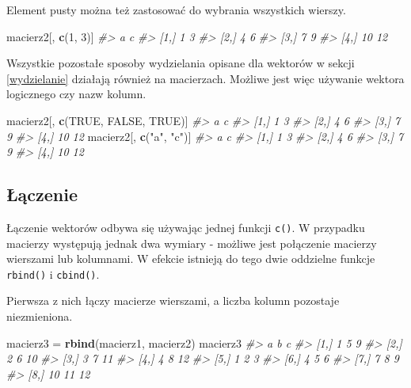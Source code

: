 \documentclass[paper=6in:9in,pagesize=pdftex,headinclude=on,footinclude=on,10pt]{scrbook}
\newenvironment{Shaded}{\begin{snugshade}}{\end{snugshade}}
\newcommand{\CommentTok}[1]{\textcolor[rgb]{0.56,0.35,0.01}{\textit{#1}}}
\newcommand{\DecValTok}[1]{\textcolor[rgb]{0.00,0.00,0.81}{#1}}
\newcommand{\KeywordTok}[1]{\textcolor[rgb]{0.13,0.29,0.53}{\textbf{#1}}}
\newcommand{\NormalTok}[1]{#1}
\newcommand{\OtherTok}[1]{\textcolor[rgb]{0.56,0.35,0.01}{#1}}
\newcommand{\StringTok}[1]{\textcolor[rgb]{0.31,0.60,0.02}{#1}}
\begin{document}
Element pusty można też zastosować do wybrania wszystkich wierszy.

\begin{Shaded}
\begin{Highlighting}[]
\NormalTok{macierz2[, }\KeywordTok{c}\NormalTok{(}\DecValTok{1}\NormalTok{, }\DecValTok{3}\NormalTok{)]}
\CommentTok{#>       a  c}
\CommentTok{#> [1,]  1  3}
\CommentTok{#> [2,]  4  6}
\CommentTok{#> [3,]  7  9}
\CommentTok{#> [4,] 10 12}
\end{Highlighting}
\end{Shaded}

Wszystkie pozostałe sposoby wydzielania opisane dla wektorów w sekcji \ref{wydzielanie} działają również na macierzach.
Możliwe jest więc używanie wektora logicznego czy nazw kolumn.

\begin{Shaded}
\begin{Highlighting}[]
\NormalTok{macierz2[, }\KeywordTok{c}\NormalTok{(}\OtherTok{TRUE}\NormalTok{, }\OtherTok{FALSE}\NormalTok{, }\OtherTok{TRUE}\NormalTok{)]}
\CommentTok{#>       a  c}
\CommentTok{#> [1,]  1  3}
\CommentTok{#> [2,]  4  6}
\CommentTok{#> [3,]  7  9}
\CommentTok{#> [4,] 10 12}
\NormalTok{macierz2[, }\KeywordTok{c}\NormalTok{(}\StringTok{"a"}\NormalTok{, }\StringTok{"c"}\NormalTok{)]}
\CommentTok{#>       a  c}
\CommentTok{#> [1,]  1  3}
\CommentTok{#> [2,]  4  6}
\CommentTok{#> [3,]  7  9}
\CommentTok{#> [4,] 10 12}
\end{Highlighting}
\end{Shaded}

\hypertarget{ux142ux105czenie}{%
\subsection{Łączenie}\label{ux142ux105czenie}}

Łączenie wektorów odbywa się używając jednej funkcji \texttt{c()}.
W przypadku macierzy występują jednak dwa wymiary - możliwe jest połączenie macierzy wierszami lub kolumnami.
W efekcie istnieją do tego dwie oddzielne funkcje \texttt{rbind()} i \texttt{cbind()}.

Pierwsza z nich łączy macierze wierszami, a liczba kolumn pozostaje niezmieniona.

\begin{Shaded}
\begin{Highlighting}[]
\NormalTok{macierz3 =}\StringTok{ }\KeywordTok{rbind}\NormalTok{(macierz1, macierz2)}
\NormalTok{macierz3}
\CommentTok{#>       a  b  c}
\CommentTok{#> [1,]  1  5  9}
\CommentTok{#> [2,]  2  6 10}
\CommentTok{#> [3,]  3  7 11}
\CommentTok{#> [4,]  4  8 12}
\CommentTok{#> [5,]  1  2  3}
\CommentTok{#> [6,]  4  5  6}
\CommentTok{#> [7,]  7  8  9}
\CommentTok{#> [8,] 10 11 12}
\end{Highlighting}
\end{Shaded}
\end{document}
